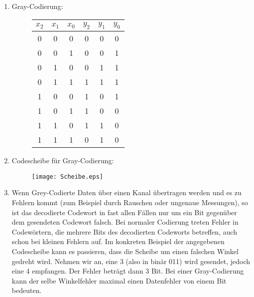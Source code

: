 \documentclass[DIN, pagenumber=false, fontsize=11pt, parskip=half]{scrartcl}
\begin{document}
    \subsection{}
    \begin{enumerate}[label=(\alph*)]
        \item 
            Gray-Codierung:
            \begin{figure}[H]
                \centering
                \begin{tabular}{ccc|ccc}
                    \toprule
                    $x_2$ & $x_1$ & $x_0$ & $y_2$ & $y_1$ & $y_0$ \\
                    \midrule
                    0 & 0 & 0 & 0 & 0 & 0\\
                    0 & 0 & 1 & 0 & 0 & 1\\
                    0 & 1 & 0 & 0 & 1 & 1\\
                    0 & 1 & 1 & 1 & 1 & 1\\
                    1 & 0 & 0 & 1 & 0 & 1\\
                    1 & 0 & 1 & 1 & 0 & 0\\
                    1 & 1 & 0 & 1 & 1 & 0\\
                    1 & 1 & 1 & 0 & 1 & 0\\
                    \bottomrule
                \end{tabular}
            \end{figure}
        \item 
            Codescheibe für Gray-Codierung:
            \begin{figure}[H]
                \centering
                \texttt{[image: Scheibe.eps]}
            \end{figure}
        \item Wenn Grey-Codierte Daten über einen Kanal übertragen werden und
            es zu Fehlern kommt (zum Beispiel durch Rauschen oder ungenaue Messungen), so ist das decodierte Codewort in fast allen Fällen nur um ein
            Bit gegenüber dem gesendeten Codewort falsch. Bei \glqq{}normaler\grqq{} Codierung treten Fehler in Codewörtern, die mehrere Bits des decodierten Codeworts betreffen, auch schon bei kleinen Fehlern auf.
			Im konkreten Beispiel der angegebenen Codescheibe kann es passieren, dass die Scheibe um einen falschen Winkel gedreht wird. Nehmen wir an, eine 3 (also in binär 011) wird \glqq{}gesendet\grqq{}, jedoch eine 4 \glqq{}empfangen\grqq{}. Der Fehler beträgt dann 3 Bit. Bei einer Gray-Codierung kann der selbe Winkelfehler maximal einen Datenfehler von einem Bit bedeuten.

\end{enumerate}
\end{document}
